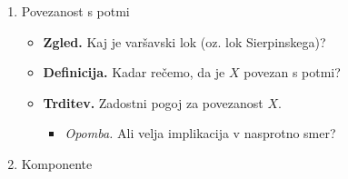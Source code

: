 \begin{enumerate}
    \item Povezanost s potmi
    \begin{itemize}
        \item \textbf{Zgled.} Kaj je varšavski lok (oz. lok Sierpinskega)?
        \item \textbf{Definicija.} Kadar rečemo, da je $X$ povezan s potmi?
        \item \textbf{Trditev.} Zadostni pogoj za povezanost $X$.
        \begin{itemize}
            \item \colorbox{yellow!30}{\emph{Opomba.}} Ali velja implikacija v nasprotno smer?
        \end{itemize}
    \end{itemize}

    \item Komponente
\end{enumerate}

